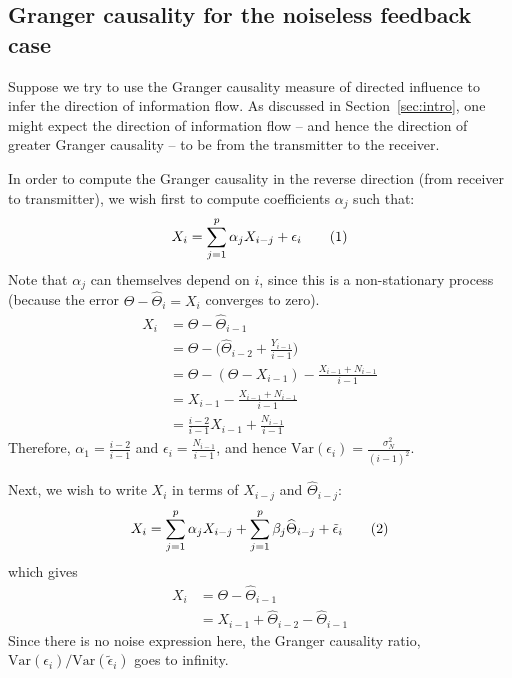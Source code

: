 \documentclass[letterpaper, 10pt, conference]{ieeeconf}
\newcommand\numberthis{\stepcounter{equation}\tag{\theequation}}
\begin{document}
\subsection{Granger causality for the noiseless feedback case}
\label{sec:gc-noiseless}

Suppose we try to use the Granger causality measure of directed influence to infer the direction of information flow. As discussed in Section~\ref{sec:intro}, one might expect the direction of information flow -- and hence the direction of greater Granger causality -- to be from the transmitter to the receiver.

In order to compute the Granger causality in the reverse direction (from receiver to transmitter), we wish first to compute coefficients $\alpha_j$ such that:
\begin{equation*}
	X_i = \sum_{j=1}^{p}{\alpha_j X_{i-j}} + \epsilon_i \numberthis \label{eq:ar-model-x-x}
\end{equation*}
Note that $\alpha_j$ can themselves depend on $i$, since this is a non-stationary process (because the error $\Theta-\widehat{\Theta}_i = X_i$ converges to zero).
\begin{align*}
	X_i &= \Theta - \widehat\Theta_{i-1} \\
		&= \Theta - \big( \widehat\Theta_{i-2} + \frac{Y_{i-1}}{i-1} \big) \\
		&= \Theta - (\Theta - X_{i-1}) - \frac{X_{i-1} + N_{i-1}}{i-1} \\
		&= X_{i-1} - \frac{X_{i-1} + N_{i-1}}{i-1} \\
		&= \frac{i-2}{i-1} X_{i-1} + \frac{N_{i-1}}{i-1}
\end{align*}
Therefore, $\alpha_1 = \frac{i-2}{i-1}$ and $\epsilon_i = \frac{N_{i-1}}{i-1}$, and hence $\text{Var}(\epsilon_i) = \frac{\sigma_N^2}{(i-1)^2}$.

Next, we wish to write $X_i$ in terms of $X_{i-j}$ and $\widehat\Theta_{i-j}$:
\begin{equation*}
	X_i = \sum_{j=1}^{p}{\alpha_j X_{i-j}} + \sum_{j=1}^{p}{\beta_j \widehat\Theta_{i-j}} + \tilde\epsilon_i \numberthis \label{eq:ar-model-x-x-theta}
\end{equation*}
which gives
\begin{align*}
	X_i &= \Theta - \widehat\Theta_{i-1} \\
		&= X_{i-1} + \widehat\Theta_{i-2} - \widehat\Theta_{i-1}
\end{align*}
Since there is no noise expression here, the Granger causality ratio, $\text{Var}(\epsilon_i) / \text{Var}(\tilde\epsilon_i)$ goes to infinity.
\end{document}
